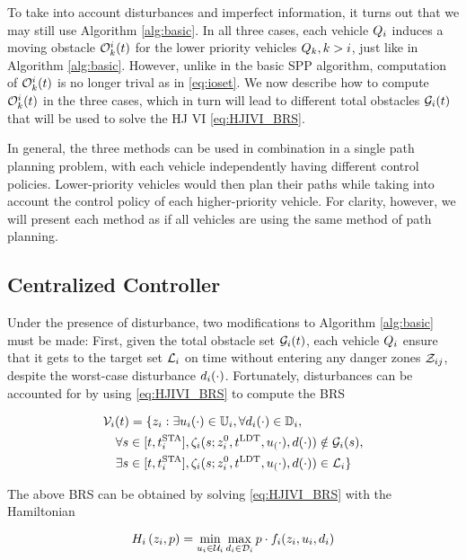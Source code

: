 To take into account disturbances and imperfect information, it turns out that we may still use Algorithm \ref{alg:basic}. In all three cases, each vehicle $Q_{i}$ induces a moving obstacle $\mathcal{O}_k^i(t)$ for the lower priority vehicles $Q_{k}, k>i$, just like in Algorithm \ref{alg:basic}. However, unlike in the basic SPP algorithm, computation of $\mathcal{O}_k^i(t)$ is no longer trival as in \eqref{eq:ioset}. We now describe how to compute $\mathcal{O}_k^i(t)$ in the three cases, which in turn will lead to different total obstacles $\mathcal{G}_i(t)$ that will be used to solve the HJ VI \eqref{eq:HJIVI_BRS}.

In general, the three methods can be used in combination in a single path planning problem, with each vehicle independently having different control policies. Lower-priority vehicles would then plan their paths while taking into account the control policy of each higher-priority vehicle. For clarity, however, we will present each method as if all vehicles are using the same method of path planning.

\subsection{Centralized Controller} \label{sec:incomp_optctrl}
Under the presence of disturbance, two modifications to Algorithm \ref{alg:basic} must be made: First, given the total obstacle set $\mathcal{G}_i(t)$, each vehicle $Q_{i}$ ensure that it gets to the target set $\mathcal{L}_i$ on time without entering any danger zones $\mathcal{Z}_{ij}$, despite the worst-case disturbance $d_i(\cdot)$. Fortunately, disturbances can be accounted for by using \eqref{eq:HJIVI_BRS} to compute the BRS 

\begin{equation}
\label{eq:BRS_cc}
\begin{aligned}
&\brs_i(t) = \{\state_i: \exists \ctrl_i(\cdot) \in \cfset_i, \forall \dstb_i(\cdot) \in \dfset_i, \\
&\quad\forall s \in [t, \sta_i], \traj_i(s; \state^0_i, \ldt, \ctrl_(\cdot), \dstb(\cdot)) \notin \obsset_i(s), \\
&\quad\exists s \in [t, \sta_i], \traj_i(s; \state^0_i, \ldt, \ctrl_(\cdot), \dstb(\cdot)) \in \targetset_i\}
\end{aligned}
\end{equation}

The above BRS can be obtained by solving \eqref{eq:HJIVI_BRS} with the Hamiltonian

\begin{equation}
H_i\left(z_i, p\right) = \min_{u_i \in \mathcal{U}_i} \max_{d_i \in \mathcal{D}_i} p \cdot f_i(z_i, u_i, d_i)
\end{equation}

